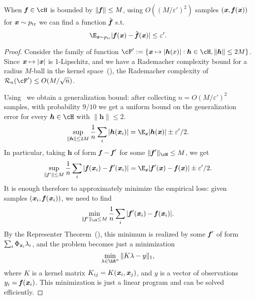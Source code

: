 \begin{lemma}
    When $\ff \in \cH$ is bounded by $\|\boldsymbol{\mathit{f}}\| \leq M$, using $O((M/\varepsilon')^2)$ samples $(\boldsymbol{\mathit{x}}, \boldsymbol{\mathit{f}}(\boldsymbol{\mathit{x}}))$ for $\boldsymbol{\mathit{x}}\sim p_{\mathrm{tr}}$ we can find a function $\hat{\boldsymbol{\mathit{f}}}$ s.t.
    \begin{equation*}
        \E_{\xx \sim \ptr} |\ff(\xx) - \hat{\ff}(\xx)| \leq \varepsilon'.
    \end{equation*}
\end{lemma}
\begin{proof} 
    Consider the family of function $\cF' := \{ \xx \mapsto |\boldsymbol{h}(x)| : \boldsymbol{h} \in \cH, \|\boldsymbol{h}\| \leq 2M \}$. Since $\boldsymbol{\mathit{x}} \mapsto |\boldsymbol{\mathit{x}}|$ is 1-Lipschitz, and we have a Rademacher complexity bound for a radius $M$-ball in the kernel space~(), the Rademacher complexity of $\mathcal{R}_{n}(\cF') \leq O(M/\sqrt{n})$.
    
    Using~ we obtain a generalization bound: after collecting $n  = O(M/\varepsilon')^2$ samples, with probability $9/10$ we get a uniform bound on the generalization error for every $\boldsymbol{h} \in \cH$ with $\|\boldsymbol{h}\| \leq 2$.  
    \begin{equation*}
        \sup_{\|\boldsymbol{h}\| \leq 2M} \frac{1}{n} \sum_i |\boldsymbol{h}(\xx_i)| = \E_{\xx} |\boldsymbol{h}(\xx)| \pm \varepsilon'/2.
    \end{equation*}
    In particular, taking $\boldsymbol{h}$ of form $\boldsymbol{\mathit{f}} - \boldsymbol{\mathit{f}}'$ for some $\|\ff'\|_{\cH} \leq M$, we get
        \begin{equation*}
        \sup_{\|\ff'\| \leq M} \frac{1}{n} \sum_i |\ff(\xx_i) - \ff'(\xx_i)| = \E_{\xx} |\ff'(\xx) - \ff(\xx)| \pm \varepsilon'/2.
    \end{equation*}
    It is enough therefore to approximately minimize the empirical loss: given samples $(\boldsymbol{\mathit{x}}_i, \boldsymbol{\mathit{f}}(\boldsymbol{\mathit{x}}_i))$, we need to find 
    \begin{equation*}
        \min_{\|\ff'\|_{\cH} \leq M} \frac{1}{n} \sum_{i} |\ff'(\xx_i) - \ff(\xx_i)|.
    \end{equation*}
    By the Representer Theorem~(), this minimum is realized by some $\boldsymbol{\mathit{f}}'$ of form $\sum_{i} \Phi_{\boldsymbol{\mathit{x}}_i} \lambda_i$, and the problem becomes just a minimization
    \begin{equation*}
        \min_{\lambda \in \bR^n} \| K \lambda - y\|_1,
    \end{equation*}
    where $K$ is a kernel matrix $K_{ij} = K(\boldsymbol{\mathit{x}}_i, \boldsymbol{\mathit{x}}_j)$, and $y$ is a vector of observations $y_i = \boldsymbol{\mathit{f}}(\boldsymbol{\mathit{x}}_i)$. This minimization is just a linear program and can be solved efficiently.
\end{proof}

